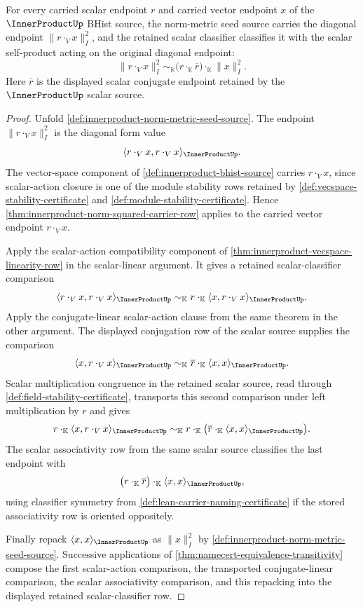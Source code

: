 \begin{theorem}
\label{thm:innerproduct-norm-squared-scalar-action-factor-row}
For every carried scalar endpoint $r$ and carried vector endpoint $x$ of the
$\InnerProductUp$ BHist source, the norm-metric seed source carries the
diagonal endpoint $\|r\cdot_V x\|_{I}^{2}$, and the retained scalar classifier
classifies it with the scalar self-product acting on the original diagonal
endpoint:
$$
\|r\cdot_V x\|_{I}^{2}
\sim_{\mathbb{K}}
\bigl(r\cdot_{\mathbb{K}}\overline{r}\bigr)
\cdot_{\mathbb{K}}
\|x\|_{I}^{2}.
$$
Here $\overline{r}$ is the displayed scalar conjugate endpoint retained by the
$\InnerProductUp$ scalar source.
\end{theorem}
\begin{proof}
Unfold \autoref{def:innerproduct-norm-metric-seed-source}. The endpoint
$\|r\cdot_V x\|_{I}^{2}$ is the diagonal form value
$$
\langle r\cdot_V x,r\cdot_V x\rangle_{\InnerProductUp}.
$$
The vector-space component of \autoref{def:innerproduct-bhist-source} carries
$r\cdot_V x$, since scalar-action closure is one of the module stability rows
retained by \autoref{def:vecspace-stability-certificate} and
\autoref{def:module-stability-certificate}. Hence
\autoref{thm:innerproduct-norm-squared-carrier-row} applies to the carried
vector endpoint $r\cdot_V x$.

Apply the scalar-action compatibility component of
\autoref{thm:innerproduct-vecspace-linearity-row} in the scalar-linear
argument. It gives a retained scalar-classifier comparison
$$
\langle r\cdot_V x,r\cdot_V x\rangle_{\InnerProductUp}
\sim_{\mathbb{K}}
r\cdot_{\mathbb{K}}
\langle x,r\cdot_V x\rangle_{\InnerProductUp}.
$$
Apply the conjugate-linear scalar-action clause from the same theorem in the
other argument. The displayed conjugation row of the scalar source supplies the
comparison
$$
\langle x,r\cdot_V x\rangle_{\InnerProductUp}
\sim_{\mathbb{K}}
\overline{r}\cdot_{\mathbb{K}}
\langle x,x\rangle_{\InnerProductUp}.
$$
Scalar multiplication congruence in the retained scalar source, read through
\autoref{def:field-stability-certificate}, transports this second comparison
under left multiplication by $r$ and gives
$$
r\cdot_{\mathbb{K}}
\langle x,r\cdot_V x\rangle_{\InnerProductUp}
\sim_{\mathbb{K}}
r\cdot_{\mathbb{K}}
\bigl(
\overline{r}\cdot_{\mathbb{K}}
\langle x,x\rangle_{\InnerProductUp}
\bigr).
$$
The scalar associativity row from the same scalar source classifies the last
endpoint with
$$
\bigl(r\cdot_{\mathbb{K}}\overline{r}\bigr)
\cdot_{\mathbb{K}}
\langle x,x\rangle_{\InnerProductUp},
$$
using classifier symmetry from \autoref{def:lean-carrier-naming-certificate}
if the stored associativity row is oriented oppositely.

Finally repack
$\langle x,x\rangle_{\InnerProductUp}$ as $\|x\|_{I}^{2}$ by
\autoref{def:innerproduct-norm-metric-seed-source}. Successive applications of
\autoref{thm:namecert-equivalence-transitivity} compose the first scalar-action
comparison, the transported conjugate-linear comparison, the scalar
associativity comparison, and this repacking into the displayed retained
scalar-classifier row.
\end{proof}
